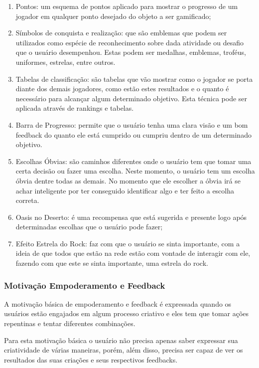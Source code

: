 \begin{enumerate}
    \item Pontos: um esquema de pontos aplicado para mostrar o progresso
        de um jogador em qualquer ponto desejado do objeto a ser gamificado;
    \item Símbolos de conquista e realização: que são emblemas que podem
        ser utilizados como espécie de reconhecimento sobre dada
        atividade ou desafio que o usuário desempenhou. Estas podem ser
        medalhas, emblemas, troféus, uniformes, estrelas, entre outros.
    \item Tabelas de classificação: são tabelas que vão mostrar como o
        jogador se porta diante dos demais jogadores, como
        estão estes resultados e o quanto é necessário para alcançar
        algum determinado objetivo. Esta técnica pode ser aplicada através
        de rankings e tabelas.
    \item Barra de Progresso: permite que o usuário tenha uma clara visão
        e um bom feedback do quanto ele está cumprido ou cumpriu dentro
        de um determinado objetivo.
    \item Escolhas Óbvias: são caminhos diferentes onde o usuário tem que tomar
        uma certa decisão ou fazer uma escolha. Neste momento, o usuário tem um
        escolha óbvia dentre todas as demais. No momento que ele escolher a óbvia
        irá se achar inteligente por ter conseguido identificar algo e ter
        feito a escolha correta.
    \item Oasis no Deserto: é uma recompensa que está sugerida e presente logo
        após determinadas escolhas que o usuário pode fazer;
    \item Efeito Estrela do Rock: faz com que o usuário se sinta importante,
        com a ideia de que todos que estão na rede estão com vontade de interagir
        com ele, fazendo com que este se sinta importante, uma estrela do rock.
\end{enumerate}

\subsubsection{Motivação Empoderamento e Feedback}
\label{sub:empoderamentoefeedback}
A motivação básica de empoderamento e feedback é expressada quando os usuários
estão engajados em algum processo criativo e eles tem que tomar ações repentinas
e tentar diferentes combinações.

Para esta motivação básica o usuário não precisa apenas saber expressar
sua criatividade de várias maneiras, porém, além disso, precisa ser capaz
de ver os resultados das suas criações e seus respectivos feedbacks.

